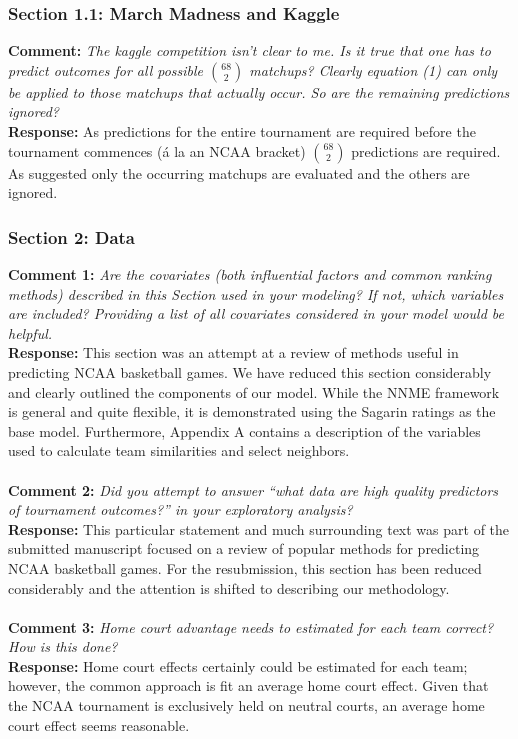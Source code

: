 \documentclass[11pt]{article} %
\begin{document}
\subsubsection*{Section 1.1: March Madness and Kaggle}
{\bf Comment:} \emph{The kaggle competition isn't clear to me. Is it true that one has to predict outcomes for all possible ${68 \choose 2}$ matchups? Clearly equation (1) can only be applied to those matchups that actually occur. So are the remaining predictions ignored?\\}
{\bf Response:} As predictions for the entire tournament are required before the tournament commences (\'a la an NCAA bracket) ${68 \choose 2}$ predictions are required. As suggested only the occurring matchups are evaluated and the others are ignored.  \\

\subsubsection*{Section 2: Data}
{\bf Comment 1:} \emph{Are the covariates (both influential factors and common ranking methods) described in this Section used in your modeling? If not, which variables are included? Providing a list of all covariates considered in your model would be helpful.\\}
{\bf Response:} This section was an attempt at a review of methods useful in predicting NCAA basketball games. We have reduced this section considerably and clearly outlined the components of our model. While the NNME framework is general and quite flexible, it is demonstrated using the Sagarin ratings as the base model. Furthermore, Appendix A contains a description of the variables used to calculate team similarities and select neighbors.\\
\\
{\bf Comment 2:} \emph{Did you attempt to answer ``what data are high quality predictors of tournament outcomes?'' in your exploratory analysis?\\}
{\bf Response:} This particular statement and much surrounding text was part of the submitted manuscript focused on a review of popular methods for predicting NCAA basketball games. For the resubmission, this section has been reduced considerably and the attention is shifted to describing our methodology.\\
\\
{\bf Comment 3:} \emph{Home court advantage needs to estimated for each team correct? How is this done?\\}
{\bf Response:} Home court effects certainly could be estimated for each team; however, the common approach is fit an average home court effect. Given that the NCAA tournament is exclusively held on neutral courts, an average home court effect seems reasonable.\\
\end{document}
